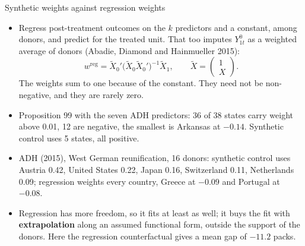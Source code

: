 \documentclass[
  11pt,
  ignorenonframetext,
  aspectratio=169,
]{beamer}
\providecommand{\tightlist}{%
  \setlength{\itemsep}{0pt}\setlength{\parskip}{0pt}}
\begin{document}
\begin{frame}{Synthetic weights against regression weights}
\protect{}\label{synthetic-weights-against-regression-weights}
\begin{itemize}
\tightlist
\item
  Regress post-treatment outcomes on the \(k\) predictors and a
  constant, among donors, and predict for the treated unit. That too
  imputes \(Y^0_{1t}\) as a weighted average of donors (Abadie, Diamond
  and Hainmueller 2015): \[
  w^{\text{reg}} = \tilde X_0' \big( \tilde X_0 \tilde X_0' \big)^{-1} \tilde X_1, \qquad \tilde X = \begin{pmatrix} 1 \\ X \end{pmatrix}.
  \] The weights sum to one because of the constant. They need not be
  non-negative, and they are rarely zero.
\item
  Proposition 99 with the seven ADH predictors: 36 of 38 states carry
  weight above 0.01, 12 are negative, the smallest is Arkansas at
  \(-0.14\). Synthetic control uses 5 states, all positive.
\item
  ADH (2015), West German reunification, 16 donors: synthetic control
  uses Austria 0.42, United States 0.22, Japan 0.16, Switzerland 0.11,
  Netherlands 0.09; regression weights every country, Greece at
  \(-0.09\) and Portugal at \(-0.08\).
\item
  Regression has more freedom, so it fits at least as well; it buys the
  fit with \textbf{extrapolation} along an assumed functional form,
  outside the support of the donors. Here the regression counterfactual
  gives a mean gap of \(-11.2\) packs.
\end{itemize}
\end{frame}
\end{document}
